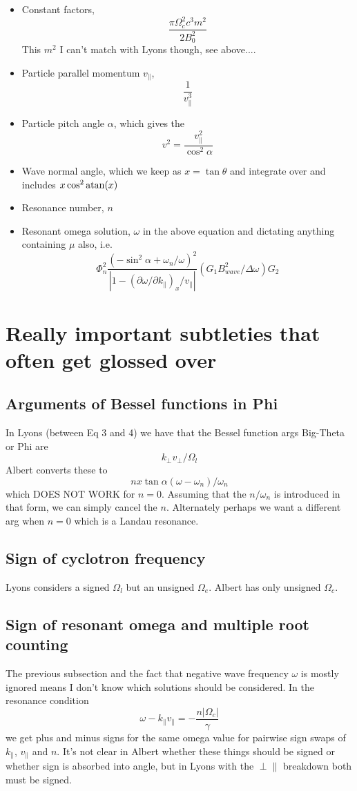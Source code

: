 \documentclass[]{article}
\begin{document}
\begin{itemize}
\item Constant factors, \[ \frac{\pi \Omega_c^2 c^3 m^2}{2 B_0^2}\] This $m^2$ I can't match with Lyons though, see above....
\item Particle parallel momentum $v_\parallel$, \[\frac{1}{v_\parallel^3}\]
\item Particle pitch angle $\alpha$, which gives the \[ v^2 = \frac{v^2_\parallel}{\cos^2 \alpha}\]
\item Wave normal angle, which we keep as $x= \tan\theta$ and integrate over and includes $x \cos^2\mathrm{atan}(x)$
\item Resonance number, $n$
\item Resonant omega solution, $\omega$ in the above equation and dictating anything containing $\mu$ also, i.e. 
\[ \Phi_n^2 \frac{(-\sin^2\alpha + \omega_n/\omega)^2}{|1-(\partial \omega/\partial k_\parallel)_x/v_\parallel|} (G_1 B_{wave}^2/\Delta\omega) G_2 \]

\end{itemize}

\section{Really important subtleties that often get glossed over}

\subsection{Arguments of Bessel functions in Phi}
In Lyons (between Eq 3 and 4) we have that the Bessel function args Big-Theta or Phi are
\[ k_\perp v_\perp / \Omega_l\]
Albert converts these to 
\[ n x \tan \alpha (\omega -\omega_n)/\omega_n\] which DOES NOT WORK for $n = 0$. Assuming that the $n/\omega_n$ is introduced in that form, we can simply cancel the $n$. Alternately perhaps we want a different arg when $n=0$ which is a Landau resonance. 

\subsection{Sign of cyclotron frequency}

Lyons considers a signed $\Omega_l$ but an unsigned $\Omega_e$. Albert has only unsigned $\Omega_c$. 

\subsection{Sign of resonant omega and multiple root counting}
The previous subsection and the fact that negative wave frequency $\omega$ is mostly ignored means I don't know which solutions should be considered. In the resonance condition
\[ \omega  - k_\parallel v_\parallel = - \frac{n |\Omega_c|}{\gamma} \] we get plus and minus signs for the same omega value for pairwise sign swaps of $k_\parallel$, $v_\parallel$ and $n$. It's not clear in Albert whether these things should be signed or whether sign is absorbed into angle, but in Lyons with the $\perp \parallel$ breakdown both must be signed. 
\end{document}
